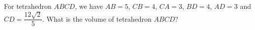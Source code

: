 For tetrahedron $ABCD$, we have $AB=5$, $CB=4$, $CA=3$, $BD=4$, $AD=3$ and $CD=\dfrac{12\sqrt2}{5}$. What is the volume of tetrahedron $ABCD$?
